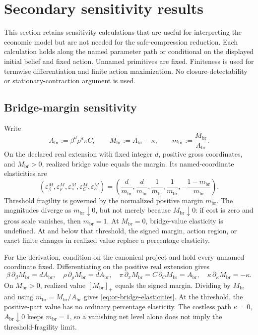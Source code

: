 \section{Secondary sensitivity results}
\label{or:aor-secondary-comparative-statics}

This section retains sensitivity calculations that are useful for interpreting
the economic model but are not needed for the safe-compression reduction.
Each calculation holds along the named parameter path or conditional on the
displayed initial belief and fixed action. Unnamed primitives are fixed.
Finiteness is used for termwise differentiation and finite action
maximization. No closure-detectability or stationary-contraction argument is
used.

\subsection{Bridge-margin sensitivity}

Write
\begin{equation}
 A_{\mathrm{br}}:=\beta^d\rho^d\pi C,
 \qquad M_{\mathrm{br}}:=A_{\mathrm{br}}-\kappa,
 \qquad m_{\mathrm{br}}:=\frac{M_{\mathrm{br}}}{A_{\mathrm{br}}}.
 \label{eq:or-bridge-margin}
\end{equation}
On the declared real extension with fixed integer \(d\), positive gross
coordinates, and \(M_{\mathrm{br}}>0\), realized bridge value equals the
margin. Its named-coordinate elasticities are
\begin{equation}
 (\varepsilon_\beta^M,\varepsilon_\rho^M,
   \varepsilon_\pi^M,\varepsilon_C^M,\varepsilon_\kappa^M)
 =\left(\frac d{m_{\mathrm{br}}},\frac d{m_{\mathrm{br}}},
   \frac1{m_{\mathrm{br}}},\frac1{m_{\mathrm{br}}},
   -\frac{1-m_{\mathrm{br}}}{m_{\mathrm{br}}}\right).
 \label{eq:or-bridge-elasticities}
\end{equation}
Threshold fragility is governed by the normalized positive margin
\(m_{\mathrm{br}}\). The magnitudes diverge as
\(m_{\mathrm{br}}\downarrow0\), but not merely because
\(M_{\mathrm{br}}\downarrow0\): if cost is zero and gross scale vanishes,
then \(m_{\mathrm{br}}=1\). At \(M_{\mathrm{br}}=0\), bridge-value
elasticity is undefined. At and below that threshold, the signed margin,
action region, or exact finite changes in realized value replace a percentage
elasticity.

For the derivation, condition on the canonical project and hold every unnamed
coordinate fixed. Differentiating on the positive real extension gives
\[
 \beta\,\partial_\beta M_{\mathrm{br}}=dA_{\mathrm{br}},
 \quad
 \rho\,\partial_\rho M_{\mathrm{br}}=dA_{\mathrm{br}},
 \quad
 \pi\,\partial_\pi M_{\mathrm{br}}
 =C\,\partial_C M_{\mathrm{br}}=A_{\mathrm{br}},
 \quad
 \kappa\,\partial_\kappa M_{\mathrm{br}}=-\kappa.
\]
On \(M_{\mathrm{br}}>0\), realized value
\([M_{\mathrm{br}}]_+\) equals the signed margin. Dividing by
\(M_{\mathrm{br}}\) and using
\(m_{\mathrm{br}}=M_{\mathrm{br}}/A_{\mathrm{br}}\) gives
\eqref{eq:or-bridge-elasticities}. At the threshold, the positive-part value
has no ordinary percentage elasticity. The costless path
\(\kappa=0\), \(A_{\mathrm{br}}\downarrow0\) keeps
\(m_{\mathrm{br}}=1\), so a vanishing net level alone does not imply the
threshold-fragility limit.

